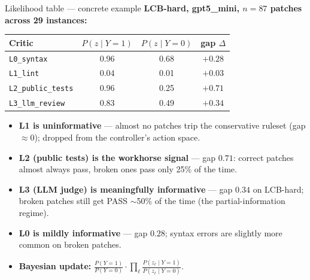 \documentclass[10pt]{beamer}
\newcommand{\good}[1]{\textcolor{accentGreen}{\textbf{#1}}}
\newcommand{\warn}[1]{\textcolor{accentOrange}{\textbf{#1}}}
\newcommand{\info}[1]{\textcolor{primaryBlue}{\textbf{#1}}}
\begin{document}
\begin{frame}{Likelihood table --- concrete example}
\info{LCB-hard, gpt5\_mini, $n = 87$ patches across 29 instances:}
\vspace{0.3cm}
\begin{table}
\centering
\small
\begin{tabular}{lccc}
\toprule
Critic & $P(z\mid Y{=}1)$ & $P(z\mid Y{=}0)$ & gap $\Delta$ \\
\midrule
\texttt{L0\_syntax} & 0.96 & 0.68 & \good{$+0.28$} \\
\texttt{L1\_lint} & 0.04 & 0.01 & \warn{$+0.03$} \\
\texttt{L2\_public\_tests} & 0.96 & 0.25 & \good{$+0.71$} \\
\texttt{L3\_llm\_review} & 0.83 & 0.49 & \good{$+0.34$} \\
\bottomrule
\end{tabular}
\end{table}
\vspace{0.4cm}
\begin{itemize}
\item \warn{L1 is uninformative} --- almost no patches trip the conservative
ruleset (gap $\approx 0$); dropped from the controller's action space.
\item \good{L2 (public tests) is the workhorse signal} --- gap $0.71$:
correct patches almost always pass, broken ones pass only 25\% of the time.
\item \good{L3 (LLM judge) is meaningfully informative} --- gap $0.34$ on
LCB-hard; broken patches still get PASS $\sim$50\% of the time (the
partial-information regime).
\item \info{L0 is mildly informative} --- gap $0.28$; syntax errors are
slightly more common on broken patches.
\item \info{Bayesian update:} $\frac{P(Y{=}1)}{P(Y{=}0)} \cdot
  \prod_\ell \frac{P(z_\ell \mid Y{=}1)}{P(z_\ell \mid Y{=}0)}$.
\end{itemize}
\end{frame}

\end{document}
